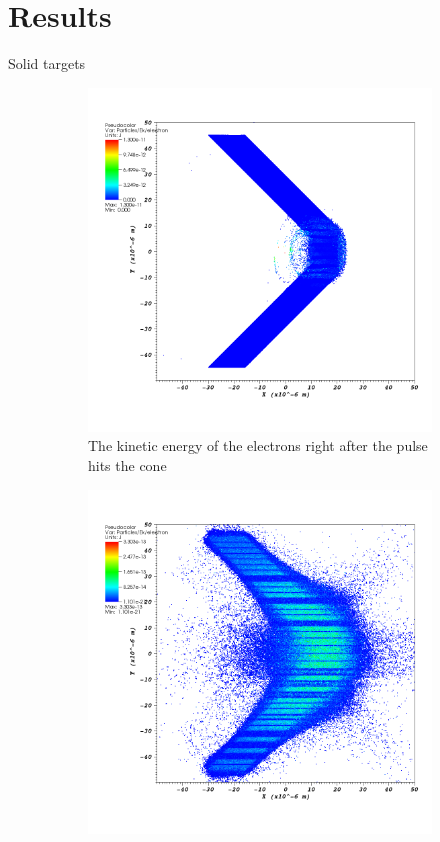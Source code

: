 \documentclass{beamer}
\begin{document}
\section{Results}

%
\begin{frame}{Solid targets}
	\begin{figure}[h]
	  \centering
	  \begin{subfigure}[b]{0.475\textwidth}
	    \centering
	    \includegraphics[width=\textwidth]{i21-ek-init-e}
	    \caption{The kinetic energy of the electrons right after the pulse
	    hits the cone}%
	  \end{subfigure}
	  \hfill
	  \begin{subfigure}[b]{0.475\textwidth}
	    \centering
	    \includegraphics[width=\textwidth]{i21-ek-end-e}

\end{subfigure}
\end{figure}
\end{frame}
\end{document}
